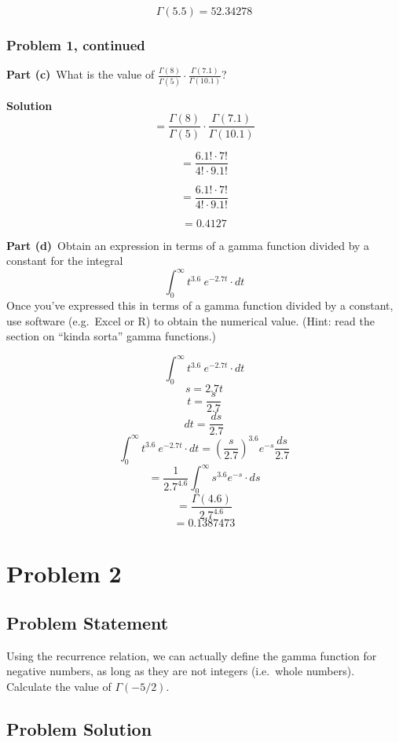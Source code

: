 \documentclass[12pt]{article}
\theoremstyle{definition}
\begin{document}
$$ \Gamma(5.5) = 52.34278$$


\newpage
\subsubsection*{Problem 1, continued}

\noindent
{\bf Part (c)}\ What is the value of $\displaystyle \frac{ \Gamma(8) }{\Gamma(5)} \cdot \frac{\Gamma(7.1)}{\Gamma(10.1)}$?

\bigskip
\noindent
{\bf Solution}
$$= \displaystyle \frac{ \Gamma(8) }{\Gamma(5)} \cdot \frac{\Gamma(7.1)}{\Gamma(10.1)}$$

$$= \frac{6.1! \cdot 7!}{4! \cdot 9.1!} $$

$$= \frac{6.1! \cdot 7!}{4! \cdot 9.1!} $$

$$= 0.4127 $$

\vspace{0.5in}
\noindent
{\bf Part (d)}\ Obtain an expression in terms of a gamma function divided by a constant for the integral
$$
\int_0^\infty t^{3.6} \ e^{-2.7t} \cdot dt
$$
Once you've expressed this in terms of a gamma function divided by a constant, use software (e.g.\ Excel or R) to obtain the numerical value. (Hint: read the section on ``kinda sorta'' gamma functions.)

$$ \int_0^\infty t^{3.6} \ e^{-2.7t} \cdot dt $$
$$ s = 2.7t $$
$$ t = \frac{s}{2.7} $$
$$ dt = \frac{ds}{2.7} $$
$$ \int_0^\infty t^{3.6} \ e^{-2.7t} \cdot dt = (\frac{s}{2.7})^{3.6} e^{-s} \frac{ds}{2.7}$$
$$ = \frac{1}{2.7^{4.6}} \int_0^\infty s^{3.6} e^{-s} \cdot ds $$
$$ = \frac{\Gamma(4.6)}{2.7^{4.6}} $$
$$ = 0.1387473 $$


\newpage
\section*{Problem 2}

\subsection*{Problem Statement}

Using the recurrence relation, we can actually define the gamma function for negative numbers, as long as they are not integers (i.e.\ whole numbers). Calculate the value of $\Gamma(-5/2)$.


\subsection*{Problem Solution}
\end{document}
